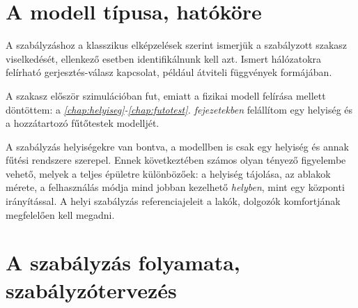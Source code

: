  


\section*{A modell típusa, hatóköre}

A szabályzáshoz a klasszikus elképzelések szerint ismerjük a szabályzott szakasz viselkedését, ellenkező esetben identifikálnunk kell azt. Ismert hálózatokra felírható gerjesztés-válasz kapcsolat, például átviteli függvények formájában. %

A szakasz először szimulációban fut, emiatt a fizikai modell felírása mellett döntöttem: a \textit{\ref{chap:helyiseg}-\ref{chap:futotest}. fejezetekben} felállítom egy helyiség és a hozzátartozó fűtőtestek modelljét. %


A szabályzás helyiségekre van bontva, a modellben is csak egy helyiség és annak fűtési rendszere szerepel. %
Ennek következtében számos olyan tényező figyelembe vehető, melyek a teljes épületre %
különbözőek: a helyiség tájolása, az ablakok mérete, a felhasználás módja mind jobban kezelhető \textit{helyben}, mint egy központi irányítással. A helyi szabályzás referenciajeleit a lakók, dolgozók komfortjának megfelelően kell megadni.


\section*{A szabályzás folyamata, szabályzótervezés}

